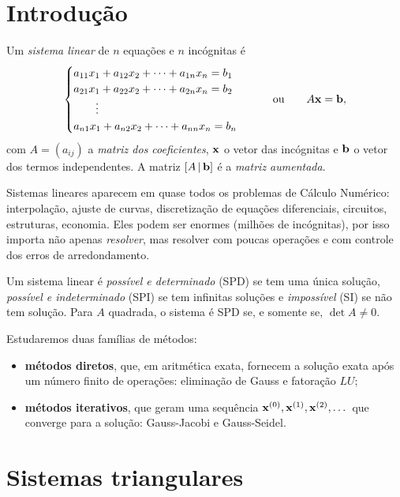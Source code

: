 \section{Introdução}

Um \emph{sistema linear} de $n$ equações e $n$ incógnitas é
\[
\begin{cases}
a_{11}x_1+a_{12}x_2+\dots+a_{1n}x_n=b_1\\
a_{21}x_1+a_{22}x_2+\dots+a_{2n}x_n=b_2\\
\qquad\vdots\\
a_{n1}x_1+a_{n2}x_2+\dots+a_{nn}x_n=b_n
\end{cases}
\qquad\text{ou}\qquad A\mathbf{x}=\mathbf{b},
\]
com $A=(a_{ij})$ a \emph{matriz dos coeficientes}, $\mathbf{x}$ o vetor das incógnitas e $\mathbf{b}$ o vetor
dos termos independentes. A matriz $[A\,|\,\mathbf{b}]$ é a \emph{matriz aumentada}.

Sistemas lineares aparecem em quase todos os problemas de Cálculo Numérico: interpolação,
ajuste de curvas, discretização de equações diferenciais, circuitos, estruturas, economia.
Eles podem ser enormes (milhões de incógnitas), por isso importa não apenas \emph{resolver},
mas resolver com poucas operações e com controle dos erros de arredondamento.

\begin{definicao}
Um sistema linear é
\emph{possível e determinado} (SPD) se tem uma única solução,
\emph{possível e indeterminado} (SPI) se tem infinitas soluções e
\emph{impossível} (SI) se não tem solução. Para $A$ quadrada, o sistema é SPD se, e somente
se, $\det A\neq0$.
\end{definicao}

Estudaremos duas famílias de métodos:
\begin{itemize}[nosep]
  \item \textbf{métodos diretos}, que, em aritmética exata, fornecem a solução exata após um
  número finito de operações: eliminação de Gauss e fatoração $LU$;
  \item \textbf{métodos iterativos}, que geram uma sequência $\mathbf{x}^{(0)},\mathbf{x}^{(1)},\mathbf{x}^{(2)},\dots$
  que converge para a solução: Gauss-Jacobi e Gauss-Seidel.
\end{itemize}

\section{Sistemas triangulares}

